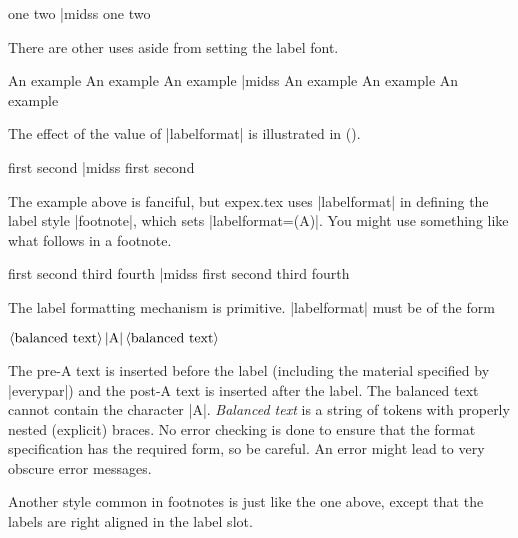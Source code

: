 \beginss
\pex[everylabel=\it]
\a one
\a two
\xe|midss
\pex[everylabel=\it]
\a one
\a two
\xe
\endss

There are other uses aside from setting the label font.

\beginss
\pex[everylabel=A,labeltype=numeric,
   samplelabel=A1.]
\a An example
\a An example
\a An example
\xe|midss
\pex[everylabel=A,labeltype=numeric,
   samplelabel=A1.]
\a An example
\a An example
\a An example
\xe
\endss

The effect of the value of |labelformat| is illustrated in
(\nextx).

\beginss
\pex[labelformat=$\langle$A$\rangle$,
   samplelabel=$\langle$a$\rangle$]
\a first
\a second
\xe|midss
\pex[labelformat=$\langle A\rangle$,
   samplelabel=$\langle A\rangle$]
\a first
\a second
\xe
\endss

The example above is fanciful, but expex.tex uses |labelformat|
in defining the label style |footnote|, which sets
|labelformat=(A)|.  You might use something like what follows in
a footnote.

\beginss
\pex[exno=1,labeltype=footnote]
\a first
\a second
\a third
\a fourth
\xe|midss
\pex[exno=1,labeltype=footnote]
\a first
\a second
\a third
\a fourth
\xe
\endss

The label formatting mechanism is primitive.
|labelformat| must
be of the form\medskip
\centerline{$\rm \langle balanced\
text\rangle\thinspace|A|\thinspace \langle balanced\ text\rangle$}
\medskip
\noindent The pre-A text is inserted before the label (including
the material specified by |everypar|) and the post-A text is
inserted after the label. The balanced text cannot contain the
character |A|.  {\it Balanced text\/} is a string of tokens with
properly nested (explicit) braces. No error checking is done to
ensure that the format specification has the required form, so be
careful.  An error might lead to very obscure error messages.

%
%
%
%
Another style common in footnotes is just like the one above,
except that the labels are right aligned in the label slot.

